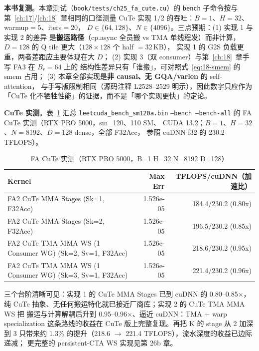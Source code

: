 \textbf{本书复测}。本章测试（\texttt{book/\allowbreak{}tests/\allowbreak{}ch25\_\allowbreak{}fa\_\allowbreak{}cute.\allowbreak{}cu}）的
\texttt{bench} 子命令按与第~\ref{ch:17}/\ref{ch:18}~章相同的口径测量
CuTe 实现 1/2 的吞吐：$B{=}1$、$H{=}32$、warmup$=5$、iters$=20$，
$D\in\{64,128\}$、$N\in\{4096\}$。三点预期：(1) 实现 1 与实现 2 的差异
是\textbf{搬运路径}（cp.async 全员搬 vs TMA 单线程发）而非计算，
$D{=}128$ 的 Q tile 更大（$128\times128$ 个 half $=32$\,KB），
实现 1 的 G2S 负载更重，两者差距应主要体现在大 $D$；
(2) 实现 3（双 consumer）与第~\ref{ch:18}~章手写 FA3 在 $B_r{=}64$ 上的
结构性差异只有「谁搬」，可对照式~\ref{eq:18-smem} 的 smem 占用；
(3) 本章全部实现是\textbf{非 causal、无 GQA/varlen} 的 self-attention，
与手写版限制相同（源码注释 L2528--2529 明示），因此数字只应作为
「CuTe 化不牺牲性能」的证据，而不是「哪个实现更快」的定论。

\textbf{CuTe 实测}。表~\ref{tab:ch25-perf} 汇总
\texttt{leetcuda\_\allowbreak{}bench\_\allowbreak{}sm120a.\allowbreak{}bin}
\texttt{--bench --bench-all} 的 FA CuTe 实测（RTX PRO 5000，sm\_120、110 SM、
CUDA 13.2；$B{=}1$、$H{=}32$、$N{=}8192$、$D{=}128$ dense，全部 F32Acc，
参照 cuDNN f32 的 230.2 TFLOPS）。

\begin{table}[H]
\centering
\caption{FA CuTe 实测（RTX PRO 5000，B=1 H=32 N=8192 D=128）}
\label{tab:ch25-perf}
\footnotesize
\setlength{\tabcolsep}{4pt}
\begin{tabular}{lrr}
\toprule
Kernel & Max Err & TFLOPS/cuDNN（加速比） \\
\midrule
FA2 CuTe MMA Stages (Sk=1, F32Acc) & 1.526e-05 & 184.4/230.2 (0.80x) \\
FA2 CuTe MMA Stages (Sk=2, F32Acc) & 1.526e-05 & 196.5/230.2 (0.85x) \\
FA2 CuTe TMA MMA WS (1 Consumer WG) (Sk=2, Sv=1, F32Acc) & 1.526e-05 & 218.6/230.2 (0.95x) \\
FA2 CuTe TMA MMA WS (1 Consumer WG) (Sk=3, Sv=1, F32Acc) & 1.526e-05 & 221.4/230.2 (0.96x) \\
\bottomrule
\end{tabular}
\end{table}

三个台阶清晰可见：实现 1 的 CuTe MMA Stages 已到 cuDNN 的 0.80--0.85$\times$，
纯 CuTe 抽象、无任何搬运特化就已接近厂商库；实现 2 的 CuTe TMA MMA WS 把
搬运与计算解耦后升到 0.95--0.96$\times$、逼近 cuDNN：TMA + warp
specialization 这条路线的收益在 CuTe 版上完整复现。再把 K 的 stage 从 2 加深到
3 只带来约 1.3\% 的提升（218.6 $\to$ 221.4 TFLOPS），流水深度的收益已边际递减；
更完整的 persistent-CTA WS 实现见第 26b 章。

